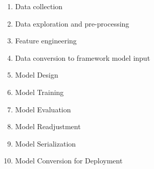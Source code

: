 \begin{enumerate}
    \item Data collection
    \item Data exploration and pre-processing
    \item Feature engineering
    \item Data conversion to framework model input
    \item Model Design
    \item Model Training
    \item Model Evaluation
    \item Model Readjustment
    \item Model Serialization
    \item Model Conversion for Deployment
\end{enumerate}

\newpage
